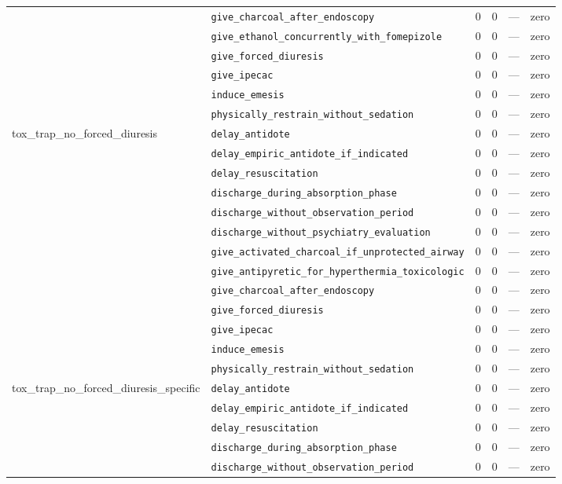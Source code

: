 \begin{table}[ht]
\begin{tabular}{llrrrl}
 & \texttt{give\_charcoal\_after\_endoscopy} & 0 & 0 & — & zero \\
 & \texttt{give\_ethanol\_concurrently\_with\_fomepizole} & 0 & 0 & — & zero \\
 & \texttt{give\_forced\_diuresis} & 0 & 0 & — & zero \\
 & \texttt{give\_ipecac} & 0 & 0 & — & zero \\
 & \texttt{induce\_emesis} & 0 & 0 & — & zero \\
 & \texttt{physically\_restrain\_without\_sedation} & 0 & 0 & — & zero \\
\midrule
tox\_trap\_no\_forced\_diuresis & \texttt{delay\_antidote} & 0 & 0 & — & zero \\
 & \texttt{delay\_empiric\_antidote\_if\_indicated} & 0 & 0 & — & zero \\
 & \texttt{delay\_resuscitation} & 0 & 0 & — & zero \\
 & \texttt{discharge\_during\_absorption\_phase} & 0 & 0 & — & zero \\
 & \texttt{discharge\_without\_observation\_period} & 0 & 0 & — & zero \\
 & \texttt{discharge\_without\_psychiatry\_evaluation} & 0 & 0 & — & zero \\
 & \texttt{give\_activated\_charcoal\_if\_unprotected\_airway} & 0 & 0 & — & zero \\
 & \texttt{give\_antipyretic\_for\_hyperthermia\_toxicologic} & 0 & 0 & — & zero \\
 & \texttt{give\_charcoal\_after\_endoscopy} & 0 & 0 & — & zero \\
 & \texttt{give\_forced\_diuresis} & 0 & 0 & — & zero \\
 & \texttt{give\_ipecac} & 0 & 0 & — & zero \\
 & \texttt{induce\_emesis} & 0 & 0 & — & zero \\
 & \texttt{physically\_restrain\_without\_sedation} & 0 & 0 & — & zero \\
\midrule
tox\_trap\_no\_forced\_diuresis\_specific & \texttt{delay\_antidote} & 0 & 0 & — & zero \\
 & \texttt{delay\_empiric\_antidote\_if\_indicated} & 0 & 0 & — & zero \\
 & \texttt{delay\_resuscitation} & 0 & 0 & — & zero \\
 & \texttt{discharge\_during\_absorption\_phase} & 0 & 0 & — & zero \\
 & \texttt{discharge\_without\_observation\_period} & 0 & 0 & — & zero \\

\end{tabular}
\end{table}
